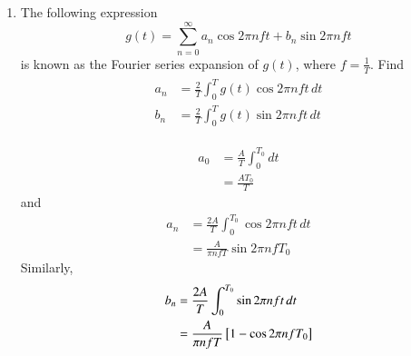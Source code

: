 \documentclass[journal,12pt,twocolumn]{IEEEtran}
\renewcommand\thesection{\arabic{section}}
\begin{document}
\begin{enumerate}[label=\thesection.\arabic*
,ref=\thesection.\theenumi]
%
\solution
The frequency of $g(t)$ is given by $f = \frac{1}{T} = 50$ Hz.
\item
The following expression
%
\begin{equation}
g(t) = \sum_{n=0}^{\infty}a_n\cos 2\pi n f t + b_n \sin 2 \pi n f t
\end{equation}
is known as the Fourier series expansion of $g(t)$, where $f = \frac{1}{T}$.  Find 
\begin{align}
\label{eq:coeffs}
\begin{split}
a_n &= \frac{2}{T} \int_{0}^{T}g(t) \cos 2\pi nf t \, dt \\
b_n &= \frac{2}{T} \int_{0}^{T}g(t) \sin 2\pi nf t \, dt
\end{split}
\end{align}

%
\solution 
\begin{align}
a_0 &= \frac{A}{T} \int_{0}^{T_0}  dt \\
&= \frac{AT_0}{T}
\end{align}
and
\begin{align}
a_n &= \frac{2A}{T} \int_{0}^{T_0}\cos 2\pi nf t \,  dt \\
&= \frac{A}{\pi n f T }\sin 2\pi n f T_0
\end{align}
Similarly, 
\begin{align}
b_n &= \frac{2A}{T} \int_{0}^{T_0}\sin 2\pi nf t \,  dt \\
&= \frac{A}{\pi n f T }{}\left[1 - \cos 2\pi n f T_0\right]
\end{align}
\end{enumerate}
\end{document}
